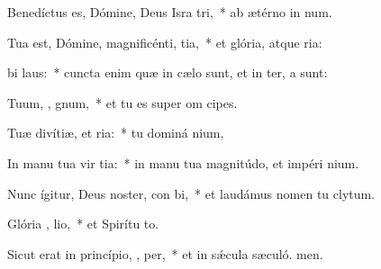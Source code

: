 \item Benedíctus es, Dómine, Deus Isra  tri,~* ab ætérno in num.
\item Tua est, Dómine, magnificénti,  tia,~* et glória, atque ria:
\item {} bi laus:~* cuncta enim quæ in cælo sunt, et in ter, a sunt:
\item Tuum, , gnum,~* et tu es super om cipes.
\item Tuæ divítiæ, et   ria:~* tu dominá nium,
\item In manu tua vir  tia:~* in manu tua magnitúdo, et impéri nium.
\item Nunc ígitur, Deus noster, con bi,~* et laudámus nomen tu clytum.
\item Glória ,  lio,~* et Spirítu to.
\item Sicut erat in princípio,  ,  per,~* et in sǽcula sæculó. men.
